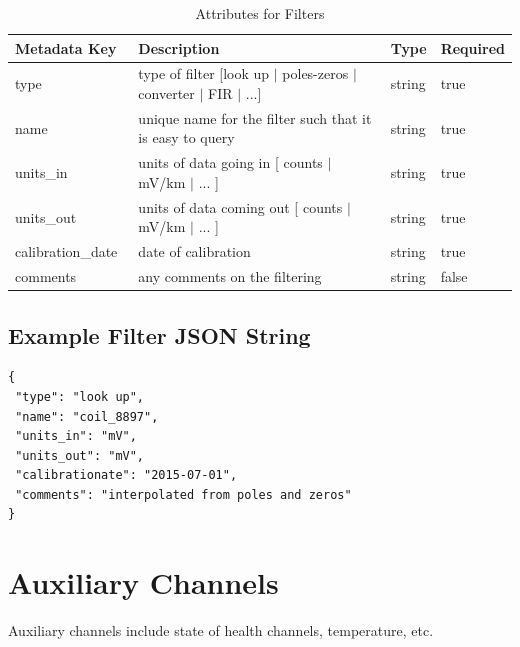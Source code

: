 \documentclass{article}
\begin{document}
\begin{table}[htb!]
    \caption[Attributes for Filter]{Attributes for Filters}
    \begin{tabular}{|l|p{3.5in}|l|l|}
        \hline
        \textbf{Metadata Key} & \textbf{Description} & \textbf{Type} & \textbf{Required} \\ \hline
        type\ & type of filter [look up $|$ poles-zeros $|$ converter $|$ FIR $|$ ...]& string &  true \\ \hline
        name\ & unique name for the filter such that it is easy to query & string & true \\ \hline
        units\_in\ & units of data going in [ counts $|$ mV/km $|$ ... ] & string & true \\ \hline
        units\_out\ & units of data coming out [ counts $|$ mV/km $|$ ... ] & string & true \\ \hline
        calibration\_date\ & date of calibration & string &  true \\ \hline
        comments\ & any comments on the filtering & string &  false \\ \hline
    \end{tabular}
    \label{tab:filter}
\end{table}

\subsection{Example Filter JSON String} 

\begin{verbatim}
{
 "type": "look up",
 "name": "coil_8897",
 "units_in": "mV",
 "units_out": "mV",
 "calibrationate": "2015-07-01",
 "comments": "interpolated from poles and zeros"
}
\end{verbatim}

\newpage

\section{Auxiliary Channels}

Auxiliary channels include state of health channels, temperature, etc.  
\end{document}
